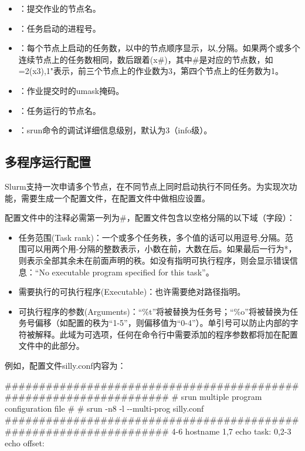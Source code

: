 \begin{itemize}
	\item {}：提交作业的节点名。
	\item {}：任务启动的进程号。
	\item {}：每个节点上启动的任务数，以中的节点顺序显示，以,分隔。如果两个或多个连续节点上的任务数相同，数后跟着(x\#)，其中\#是对应的节点数，如=2(x3),1"表示，前三个节点上的作业数为3，第四个节点上的任务数为1。
	\item {}：作业提交时的umask掩码。
	\item {}：任务运行的节点名。
	\item {}：srun命令的调试详细信息级别，默认为3（info级）。
\end{itemize}

\subsection{多程序运行配置}
Slurm支持一次申请多个节点，在不同节点上同时启动执行不同任务。为实现次功能，需要生成一个配置文件，在配置文件中做相应设置。

配置文件中的注释必需第一列为\#，配置文件包含以空格分隔的以下域（字段）：
\begin{itemize}
	\item 任务范围(Task rank)：一个或多个任务秩，多个值的话可以用逗号,分隔。范围可以用两个用-分隔的整数表示，小数在前，大数在后。如果最后一行为*，则表示全部其余未在前面声明的秩。如没有指明可执行程序，则会显示错误信息：``No executable program specified for this task''。
    \item 需要执行的可执行程序(Executable)：也许需要绝对路径指明。
    \item 可执行程序的参数(Arguments)：``\%t''将被替换为任务号；``\%o''将被替换为任务号偏移（如配置的秩为``1-5''，则偏移值为``0-4''）。单引号可以防止内部的字符被解释。此域为可选项，任何在命令行中需要添加的程序参数都将加在配置文件中的此部分。
\end{itemize}
例如，配置文件silly.conf内容为：
\begin{SH}
###################################################################
# srun multiple program configuration file
#
# srun -n8 -l -{}-multi-prog silly.conf
###################################################################
4-6       hostname
1,7       echo  task:%
0,2-3     echo  offset:%
\end{SH}

